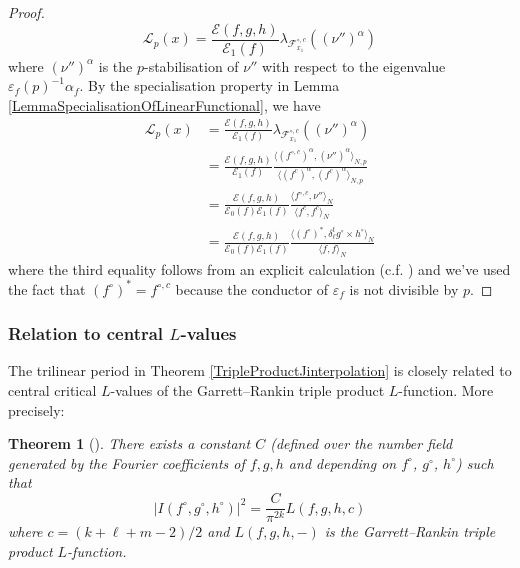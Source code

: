 \documentclass[10pt, oneside]{amsart}
\numberwithin{equation}{subsection}
\newtheorem{theorem}[equation]{Theorem}
\theoremstyle{definition}
\theoremstyle{remark}
\begin{document}
\begin{proof}
\[
\mathscr{L}_p(x) =  \frac{\mathcal{E}(f, g, h)}{\mathcal{E}_1(f)} \lambda_{\mathcal{F}_{x_1}^{\circ, c}}((\nu'')^{\alpha})
\]
where $(\nu'')^{\alpha}$ is the $p$-stabilisation of $\nu''$ with respect to the eigenvalue $\varepsilon_f(p)^{-1} \alpha_f$. By the specialisation property in Lemma \ref{LemmaSpecialisationOfLinearFunctional}, we have
\begin{align*}
    \mathscr{L}_p(x) &= \frac{\mathcal{E}(f, g, h)}{\mathcal{E}_1(f)} \lambda_{\mathcal{F}_{x_1}^{\circ, c}}( (\nu'')^{\alpha}) \\
    &= \frac{\mathcal{E}(f, g, h)}{\mathcal{E}_1(f)} \frac{\langle (f^{\circ, c})^{\alpha}, (\nu'')^{\alpha} \rangle_{N, p}}{\langle (f^c)^{\alpha}, (f^c)^{\alpha} \rangle_{N, p}} \\
    &= \frac{\mathcal{E}(f, g, h)}{\mathcal{E}_0(f)\mathcal{E}_1(f)} \frac{\langle f^{\circ, c}, \nu'' \rangle_{N}}{\langle f^c, f^c \rangle_{N}} \\
    &= \frac{\mathcal{E}(f, g, h)}{\mathcal{E}_0(f)\mathcal{E}_1(f)} \frac{\langle (f^{\circ})^*, \delta_\ell^t g^{\circ} \times h^{\circ} \rangle_{N}}{\langle f, f \rangle_{N}}
\end{align*}
where the third equality follows from an explicit calculation (c.f. \cite[Lemma 5.12]{AI_LLL}) and we've used the fact that $(f^{\circ})^* = f^{\circ, c}$ because the conductor of $\varepsilon_f$ is not divisible by $p$.
\end{proof}

\subsubsection{Relation to central $L$-values} \label{ChoiceOfTestdataSec}

The trilinear period in Theorem \ref{TripleProductJinterpolation} is closely related to central critical $L$-values of the Garrett--Rankin triple product $L$-function. More precisely:

\begin{theorem}[{\cite[Theorem 4.2]{DarmonRotgerGrossZagier1}}]
There exists a constant $C$ (defined over the number field generated by the Fourier coefficients of $f, g, h$ and depending on $f^{\circ}$, $g^{\circ}$, $h^{\circ}$) such that
\[
|I(f^{\circ}, g^{\circ}, h^{\circ})|^2 = \frac{C}{\pi^{2k}} L(f, g, h, c)
\]
where $c = (k+\ell+m - 2)/2$ and $L(f, g, h, -)$ is the Garrett--Rankin triple product $L$-function.
\end{theorem}
\end{document}
